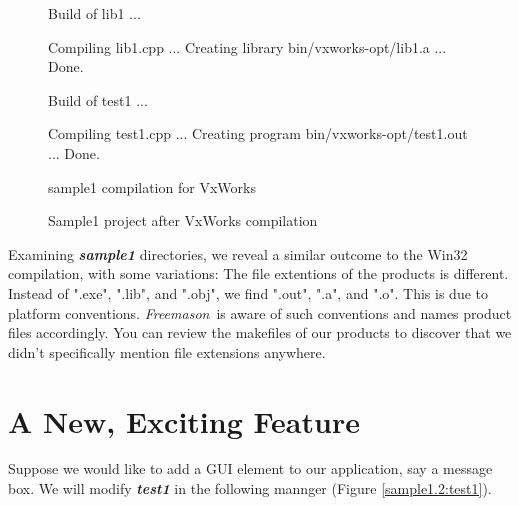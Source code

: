 \documentclass[a4paper]{article}
\newcommand{\freemason}{\textit{Freemason}}
\newcommand{\nameb}[1]{\textbf{\emph{#1}}}
\begin{document}
\begin{figure}[h]
\caption{\label{sample1:output.1}sample1 compilation for VxWorks}
\begin{Code}
Build of lib1 ...

Compiling lib1.cpp ...
Creating library bin/vxworks-opt/lib1.a ...
Done.

Build of test1 ...

Compiling test1.cpp ...
Creating program bin/vxworks-opt/test1.out ...
Done.
\end{Code}
\end{figure}

\begin{figure}[h]
\caption{\label{sample1:project.4}Sample1 project after VxWorks compilation}
\begin{center}\end{center}
\end{figure}

Examining \nameb{sample1} directories, we reveal a similar outcome to the Win32 compilation, with some variations:
The file extentions of the products is different. Instead of ".exe", ".lib", and ".obj", we find ".out", ".a", and ".o".
This is due to platform conventions. \freemason\ is aware of such conventions and names product files accordingly. You can
review the makefiles of our products to discover that we didn't specifically mention file extensions anywhere.

\section{A New, Exciting Feature}

Suppose we would like to add a GUI element to our application, say a message box. We will modify \nameb{test1} in
the following mannger (Figure \ref{sample1.2:test1}).
\end{document}
